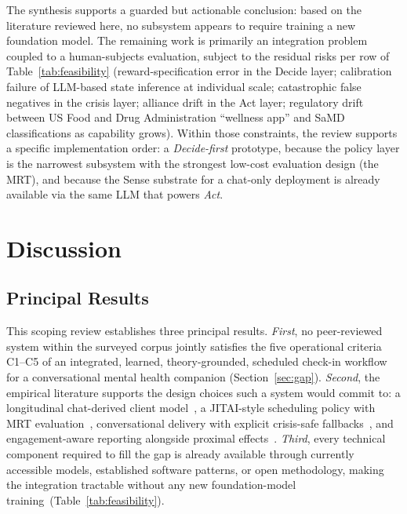 \documentclass[11pt,a4paper]{article}
\newcommand{\secref}[1]{Section~\ref{#1}}
\newcommand{\tabref}[1]{Table~\ref{#1}}
\begin{document}
The synthesis supports a guarded but actionable conclusion: based
on the literature reviewed here, no subsystem appears to require
training a new foundation model. The remaining work is primarily
an integration problem coupled to a human-subjects evaluation,
subject to the residual risks per row of \tabref{tab:feasibility}
(reward-specification error in the Decide layer; calibration
failure of LLM-based state inference at individual scale;
catastrophic false negatives in the crisis layer; alliance drift
in the Act layer; regulatory drift between US Food and Drug
Administration ``wellness app'' and SaMD classifications as
capability grows). Within those constraints, the review supports a
specific implementation order: a \emph{Decide-first} prototype,
because the policy layer is the narrowest subsystem with the
strongest low-cost evaluation design (the MRT), and because the
Sense substrate for a chat-only deployment is already available
via the same LLM that powers \emph{Act}.

\section{Discussion}\label{sec:discussion}

\subsection{Principal Results}\label{sec:principal-results}

This scoping review establishes three principal results.
\emph{First}, no peer-reviewed system within the surveyed corpus
jointly satisfies the five operational criteria \mbox{C1--C5} of an
integrated, learned, theory-grounded, scheduled check-in workflow
for a conversational mental health companion (\secref{sec:gap}).
\emph{Second}, the empirical literature supports the design choices
such a system would commit to: a longitudinal chat-derived client
model~\cite{Xu2024MentalLLM,Wang2020COVIDStudentLife}, a JITAI-style
scheduling policy with MRT
evaluation~\cite{NahumShani2018JITAI,Klasnja2015MRT}, conversational
delivery with explicit crisis-safe
fallbacks~\cite{Heinz2025TherabotRCT,DeFreitas2024ChatbotSafety},
and engagement-aware reporting alongside proximal
effects~\cite{Linardon2020Attrition}. \emph{Third}, every technical
component required to fill the gap is already available through
currently accessible models, established software patterns, or open
methodology, making the integration tractable without any new
foundation-model
training~(\tabref{tab:feasibility}).
\end{document}
